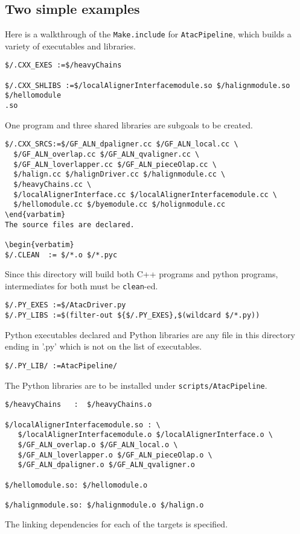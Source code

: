 \documentclass{article}
\begin{document}
\subsection{Two simple examples}

Here is a walkthrough of the \verb+Make.include+ for
\verb+AtacPipeline+, which builds a variety of executables and
libraries.

\begin{verbatim}
$/.CXX_EXES :=$/heavyChains

$/.CXX_SHLIBS :=$/localAlignerInterfacemodule.so $/halignmodule.so $/hellomodule
.so
\end{verbatim}
One program and three shared libraries are subgoals to be created.

\begin{verbatim}
$/.CXX_SRCS:=$/GF_ALN_dpaligner.cc $/GF_ALN_local.cc \
  $/GF_ALN_overlap.cc $/GF_ALN_qvaligner.cc \
  $/GF_ALN_loverlapper.cc $/GF_ALN_pieceOlap.cc \
  $/halign.cc $/halignDriver.cc $/halignmodule.cc \
  $/heavyChains.cc \
  $/localAlignerInterface.cc $/localAlignerInterfacemodule.cc \
  $/hellomodule.cc $/byemodule.cc $/holignmodule.cc
\end{varbatim}
The source files are declared.

\begin{verbatim}
$/.CLEAN  := $/*.o $/*.pyc
\end{verbatim}
Since this directory will build both C++ programs and python programs,
intermediates for both must be \verb+clean+-ed.

\begin{verbatim}
$/.PY_EXES :=$/AtacDriver.py
$/.PY_LIBS :=$(filter-out ${$/.PY_EXES},$(wildcard $/*.py))
\end{verbatim}
Python executables declared and Python libraries are any file in
this directory ending in '.py' which is not on the list of executables.
\begin{verbatim}
$/.PY_LIB/ :=AtacPipeline/
\end{verbatim}
The Python libraries are to be installed under \verb+scripts/AtacPipeline+.

\begin{verbatim}
$/heavyChains   :  $/heavyChains.o

$/localAlignerInterfacemodule.so : \
   $/localAlignerInterfacemodule.o $/localAlignerInterface.o \
   $/GF_ALN_overlap.o $/GF_ALN_local.o \
   $/GF_ALN_loverlapper.o $/GF_ALN_pieceOlap.o \
   $/GF_ALN_dpaligner.o $/GF_ALN_qvaligner.o

$/hellomodule.so: $/hellomodule.o

$/halignmodule.so: $/halignmodule.o $/halign.o
\end{verbatim}
The linking dependencies for each of the targets is specified.
\end{document}
